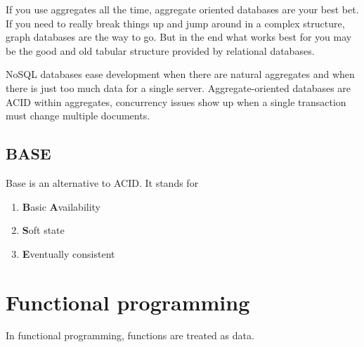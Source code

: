 \documentclass[12pt, oneside]{book}
\begin{document}
If you use aggregates all the time, aggregate oriented databases are your best
bet. If you need to really break things up and jump around in a complex
structure, graph databases are the way to go. But in the end what works best for
you may be the good and old tabular structure provided by relational databases.

NoSQL databases ease development when there are natural aggregates and when
there is just too much data for a single server.
Aggregate-oriented databases are ACID within aggregates, concurrency issues show
up when a single transaction must change multiple documents.

\section{BASE}
Base is an alternative to ACID.
It stands for

\begin{enumerate}
  \item \textbf{B}asic \textbf{A}vailability
  \item \textbf{S}oft state
  \item \textbf{E}ventually consistent
\end{enumerate}

\chapter{Functional programming}
In functional programming, functions are treated as data.

\printbibliography
\end{document}
